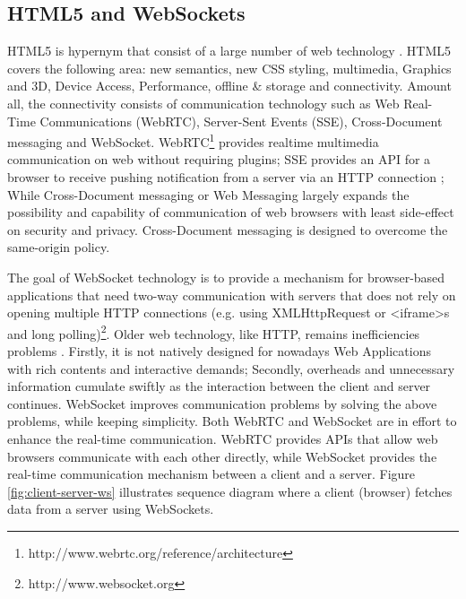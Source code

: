 \subsection{HTML5 and WebSockets}
\label{HTML5andWebSockets}

HTML5 is hypernym that consist of a large number of web technology \cite{wang2012definitive}. HTML5 covers the following area: new semantics, new CSS styling, multimedia, Graphics and 3D, Device Access, Performance, offline \& storage and connectivity. Amount all, the connectivity consists of communication technology such as Web Real-Time Communications (WebRTC), Server-Sent Events (SSE), Cross-Document messaging and WebSocket. WebRTC\footnote{http://www.webrtc.org/reference/architecture} provides realtime multimedia communication on web without requiring plugins; SSE provides an API for a browser to receive pushing notification from a server via an HTTP connection \cite{hickson2009server}; While Cross-Document messaging or Web Messaging largely expands the possibility and capability of communication of web browsers with least side-effect on security and privacy. Cross-Document messaging is designed to overcome the same-origin policy.

The goal of WebSocket technology is to provide a mechanism for browser-based applications that need two-way communication with servers that does not rely on opening multiple HTTP connections (e.g. using XMLHttpRequest or <iframe>s and long polling)\footnote{http://www.websocket.org}. Older web technology, like HTTP, remains inefficiencies problems \cite{wang2012definitive}. Firstly, it is not natively designed for nowadays Web Applications with rich contents and interactive demands; Secondly, overheads and unnecessary information cumulate swiftly as the interaction between the client and server continues. WebSocket improves communication problems by solving the above problems, while keeping simplicity. Both WebRTC and WebSocket are in effort to enhance the real-time communication. WebRTC provides APIs that allow web browsers communicate with each other directly, while WebSocket provides the real-time communication mechanism between a client and a server. Figure \ref{fig:client-server-ws} illustrates sequence diagram where a client (browser) fetches data from a server using WebSockets.

